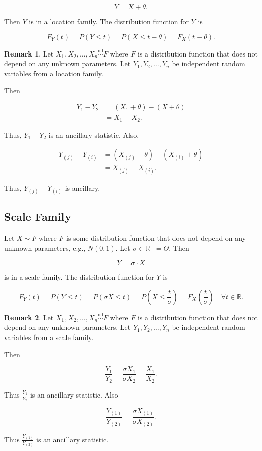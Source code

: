 \documentclass[12pt]{article}
\theoremstyle{definition}
\newtheorem*{remark}{Remark}
\begin{document}
$$ Y = X + \theta. $$

Then $Y$ is in a location family. The distribution function for $Y$ is

$$ F_Y(t) = P(Y \leq t) = P(X \leq t - \theta) = F_X(t - \theta). $$


\begin{remark}
Let $X_1, X_2, \ldots, X_n \overset{\text{iid}}{\sim} F$ where $F$ is
a distribution function that does not depend on any unknown parameters.
Let $Y_1, Y_2, \ldots, Y_n$ be independent random variables from a
location family.

Then

\begin{align*}
Y_1 - Y_2 &= (X_1 + \theta) - (X + \theta) \\
&= X_1 - X_2.
\end{align*}

Thus, $Y_1 - Y_2$ is an ancillary statistic. Also,

\begin{align*}
Y_{(j)} - Y_{(i)} &= (X_{(j)} + \theta) - (X_{(i)} + \theta) \\
&= X_{(j)} - X_{(i)}.
\end{align*}

Thus, $Y_{(j)} - Y_{(i)}$ is ancillary.
\end{remark}

\subsection{Scale Family}

Let $X \sim F$ where $F$ is some distribution function that does not depend
on any unknown parameters, e.g., $N(0,1)$. Let $\sigma \in \mathbb{R}_{+} = \Theta$. Then

$$ Y = \sigma \cdot X $$

is in a scale family. The distribution function for $Y$ is

$$ F_Y(t) = P(Y \leq t) = P(\sigma X \leq t) = P \left(X \leq \frac{t}{\sigma} \right) = 
F_X \left(\frac{t}{\sigma} \right) \quad \forall t \in \mathbb{R}. $$

\begin{remark}
Let $X_1, X_2, \ldots, X_n \overset{\text{iid}}{\sim} F$ where $F$ is
a distribution function that does not depend on any unknown parameters.
Let $Y_1, Y_2, \ldots, Y_n$ be independent random variables from a
scale family.

Then

\begin{equation*}
\frac{Y_1}{Y_2} = \frac{\sigma X_1}{\sigma X_2} = \frac{X_1}{X_2}.
\end{equation*}

Thus $\displaystyle \frac{Y_1}{Y_2}$ is an ancillary statistic. Also

\begin{equation*}
\frac{Y_{(1)}}{Y_{(2)}} = \frac{\sigma X_{(1)}}{\sigma X_{(2)}}.
\end{equation*}

Thus $\displaystyle \frac{Y_{(1)}}{Y_{(2)}}$ is an ancillary statistic.
\end{remark}
\end{document}
